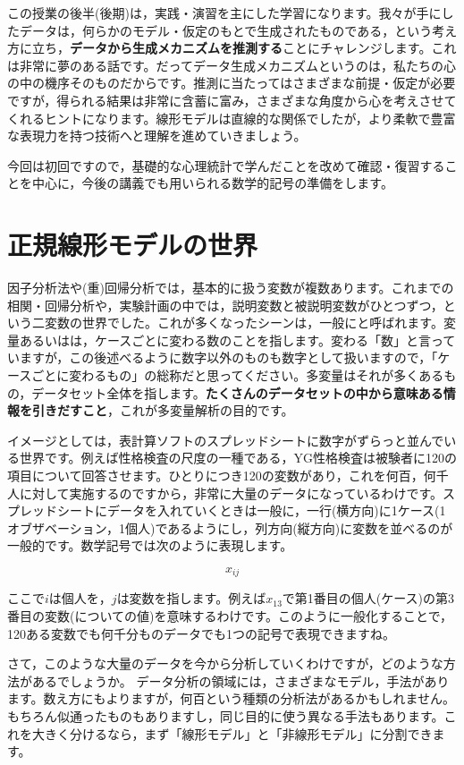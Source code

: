 \documentclass{ltjsbook}
\begin{document}
この授業の後半(後期)は，実践・演習を主にした学習になります。我々が手にしたデータは，何らかのモデル・仮定のもとで生成されたものである，という考え方に立ち，\textbf{データから生成メカニズムを推測する}ことにチャレンジします。これは非常に夢のある話です。だってデータ生成メカニズムというのは，私たちの心の中の機序そのものだからです。推測に当たってはさまざまな前提・仮定が必要ですが，得られる結果は非常に含蓄に富み，さまざまな角度から心を考えさせてくれるヒントになります。線形モデルは直線的な関係でしたが，より柔軟で豊富な表現力を持つ技術へと理解を進めていきましょう。

今回は初回ですので，基礎的な心理統計で学んだことを改めて確認・復習することを中心に，今後の講義でも用いられる数学的記号の準備をします。

\section{正規線形モデルの世界}

因子分析法や(重)回帰分析では，基本的に扱う変数が複数あります。これまでの相関・回帰分析や，実験計画の中では，説明変数と被説明変数がひとつずつ，という二変数の世界でした。これが多くなったシーンは，一般にと呼ばれます。変量あるいはは，ケースごとに変わる数のことを指します。変わる「数」と言っていますが，この後述べるように数字以外のものも数字として扱いますので，「ケースごとに変わるもの」の総称だと思ってください。多変量はそれが多くあるもの，データセット全体を指します。\textbf{たくさんのデータセットの中から意味ある情報を引きだすこと}，これが多変量解析の目的です。

イメージとしては，表計算ソフトのスプレッドシートに数字がずらっと並んでいる世界です。例えば性格検査の尺度の一種である，YG性格検査は被験者に120の項目について回答させます。ひとりにつき120の変数があり，これを何百，何千人に対して実施するのですから，非常に大量のデータになっているわけです。スプレッドシートにデータを入れていくときは一般に，一行(横方向)に1ケース(1オブザベーション，1個人)であるようにし，列方向(縦方向)に変数を並べるのが一般的です。数学記号では次のように表現します。

\[ x_{ij }\]

ここで$i$は個人を，$j$は変数を指します。例えば$x_{13}$で第1番目の個人(ケース)の第3番目の変数(についての値)を意味するわけです。このように一般化することで，120ある変数でも何千分ものデータでも1つの記号で表現できますね。

さて，このような大量のデータを今から分析していくわけですが，どのような方法があるでしょうか。
データ分析の領域には，さまざまなモデル，手法があります。数え方にもよりますが，何百という種類の分析法があるかもしれません。もちろん似通ったものもありますし，同じ目的に使う異なる手法もあります。これを大きく分けるなら，まず「線形モデル」と「非線形モデル」に分割できます。
\end{document}
